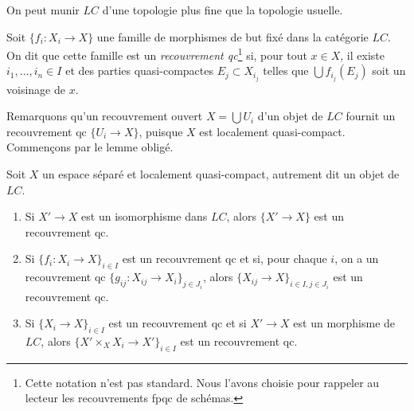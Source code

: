 \noindent
On peut munir $\textit{LC}$ d'une topologie plus fine que la topologie usuelle.

\begin{definition}
\label{definition-covering-LC}
Soit $\{f_i : X_i \to X\}$ une famille de morphismes de but fixé dans la
catégorie $\textit{LC}$. On dit que cette famille est un
{\it recouvrement qc}\footnote{Cette notation n'est pas standard.
Nous l'avons choisie pour rappeler au lecteur les recouvrements fpqc
de schémas.}
si, pour tout $x \in X$, il existe $i_1, \ldots, i_n \in I$ et des parties
quasi-compactes $E_j \subset X_{i_j}$ telles que
$\bigcup f_{i_j}(E_j)$ soit un voisinage de $x$.
\end{definition}

\noindent
Remarquons qu'un recouvrement ouvert $X = \bigcup U_i$ d'un objet de
$\textit{LC}$ fournit un recouvrement qc $\{U_i \to X\}$, puisque $X$ est
localement quasi-compact. Commençons par le lemme obligé.

\begin{lemma}
\label{lemma-qc}
Soit $X$ un espace séparé et localement quasi-compact, autrement dit un
objet de $\textit{LC}$.
\begin{enumerate}
\item Si $X' \to X$ est un isomorphisme dans $\textit{LC}$, alors
$\{X' \to X\}$ est un recouvrement qc.
\item Si $\{f_i : X_i \to X\}_{i\in I}$ est un recouvrement qc et si, pour
chaque $i$, on a un recouvrement qc
$\{g_{ij} : X_{ij} \to X_i\}_{j\in J_i}$, alors
$\{X_{ij} \to X\}_{i \in I, j\in J_i}$ est un recouvrement qc.
\item Si $\{X_i \to X\}_{i\in I}$ est un recouvrement qc et si
$X' \to X$ est un morphisme de $\textit{LC}$, alors
$\{X' \times_X X_i \to X'\}_{i\in I}$ est un recouvrement qc.
\end{enumerate}
\end{lemma}

